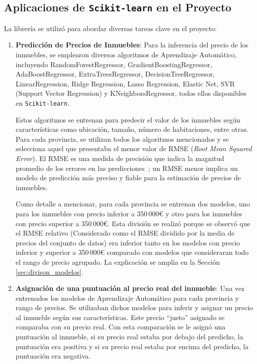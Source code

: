 \subsection{Aplicaciones de \texttt{Scikit-learn} en el Proyecto}

La librería se utilizó para abordar diversas tareas clave en el proyecto:

\begin{enumerate}
\item \textbf{Predicción de Precios de Inmuebles}: Para la inferencia del precio de los inmuebles, se emplearon diversos algoritmos de Aprendizaje Automático, incluyendo RandomForestRegressor, GradientBoostingRegressor, AdaBoostRegressor, ExtraTreesRegressor, DecisionTreeRegressor, LinearRegression, Ridge Regression, Lasso Regression, Elastic Net, SVR (Support Vector Regression) y KNeighborsRegressor, todos ellos disponibles en \texttt{Scikit-learn}. 

Estos algoritmos se entrenan para predecir el valor de los inmuebles según características como ubicación, tamaño, número de habitaciones, entre otras. Para cada provincia, se utilizan todos los algoritmos mencionados y se selecciona aquel que presentaba el menor valor de RMSE (\textit{Root Mean Squared Error}). El RMSE es una medida de precisión que indica la magnitud promedio de los errores en las predicciones~\cite{chai2014}; un RMSE menor implica un modelo de predicción más preciso y fiable para la estimación de precios de inmuebles. 

Como detalle a mencionar, para cada provincia se entrenan dos modelos, uno para los inmuebles con precio inferior a 350\,000€ y otro para los inmuebles con precio superior a 350\,000€. Esta división se realizó porque se observó que el RMSE relativo (Considerado como el RMSE dividido por la media de precios del conjunto de datos) era inferior tanto en los modelos con precio inferior y superior a 350\,000€ comparado con modelos que consideraran todo el rango de precio agrupado. La explicación se amplia en la Sección \ref{sec:divison_modelos}.

\clearpage
\item \textbf{Asignación de una puntuación al precio real del inmueble}: Una vez entrenados los modelos de Aprendizaje Automático para cada provincia y rango de precios. Se utilizaban dichos modelos para inferir y asignar un precio al inmueble según sus características. Este precio ``justo'' asignado se comparaba con su precio real. Con esta comparación se le asignó una puntuación al inmueble, si su precio real estaba por debajo del predicho, la puntuación era positiva y si su precio real estaba por encima del predicho, la puntuación era negativa.

\end{enumerate}

